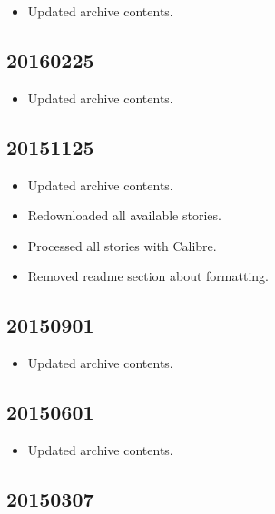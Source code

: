 \documentclass[hidelinks,a4paper,12pt]{article}
\begin{document}
\begin{itemize}
\item Updated archive contents.
\end{itemize}

\subsection{20160225}  \label{sec:changelog_20160225}

\begin{itemize}
\item Updated archive contents.
\end{itemize}

\subsection{20151125}  \label{sec:changelog_20151125}

\begin{itemize}
\item Updated archive contents.
\item Redownloaded all available stories.
\item Processed all stories with Calibre.
\item Removed readme section about formatting.
\end{itemize}

\subsection{20150901}  \label{sec:changelog_20150901}

\begin{itemize}
\item Updated archive contents.
\end{itemize}

\subsection{20150601}  \label{sec:changelog_20150601}

\begin{itemize}
\item Updated archive contents.
\end{itemize}

\subsection{20150307}  \label{sec:changelog_20150307}
\end{document}
